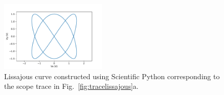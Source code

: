 \begin{figure}[htbp]
\begin{center}
\includegraphics[width=0.45\textwidth]{figs/labs/lissajous/pythonlissajous.pdf} 
\caption{Lissajous curve constructed using Scientific Python corresponding to the scope trace in Fig.~\ref{fig:tracelissajous}a.}
\label{fig:pythonlissajous}
\end{center}
\end{figure}
